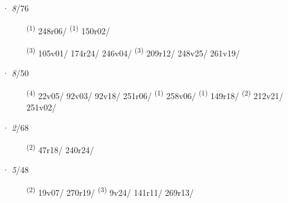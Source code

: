 \noindent{} · \textit{8}/76 \LEMMALINE
\begin{description}
    \item[]  \textsuperscript{(1)} \mbox{248r06/} \CASEBREAK {} \textsuperscript{(1)} \mbox{150r02/}
    \item[]  \textsuperscript{(3)} \mbox{105v01/} \mbox{174r24/} \mbox{246v04/} \CASEBREAK {} \textsuperscript{(3)} \mbox{209r12/} \mbox{248v25/} \mbox{261v19/}
\end{description}
\ENTRYEND
\noindent{} · \textit{8}/50 \LEMMALINE
\begin{description}
    \item[]  \textsuperscript{(4)} \mbox{22v05/} \mbox{92v03/} \mbox{92v18/} \mbox{251r06/} \textsuperscript{(1)} \mbox{258v06/} \CASEBREAK {} \textsuperscript{(1)} \mbox{149r18/} \textsuperscript{(2)} \mbox{212v21/} \mbox{251v02/}
\end{description}
\ENTRYEND
\noindent{} · \textit{2}/68 \LEMMALINE
\begin{description}
    \item[]  \textsuperscript{(2)} \mbox{47r18/} \mbox{240r24/}
\end{description}
\ENTRYEND
\noindent{} · \textit{5}/48 \LEMMALINE
\begin{description}
    \item[]  \textsuperscript{(2)} \mbox{19v07/} \mbox{270r19/} \CASEBREAK {} \textsuperscript{(3)} \mbox{9v24/} \mbox{141r11/} \mbox{269r13/}
\end{description}
\ENTRYEND
